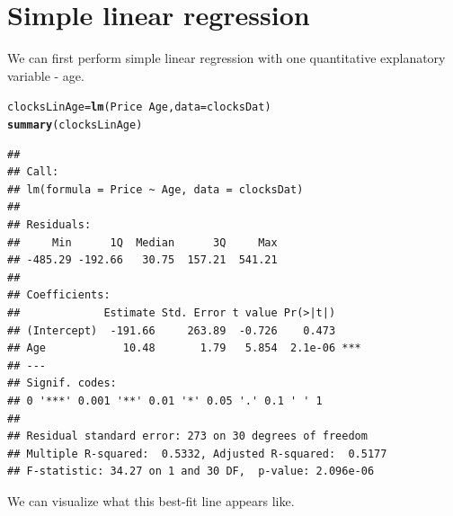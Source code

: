 \documentclass{article}\usepackage[]{graphicx}\usepackage[]{color}
\makeatletter
\newcommand{\hlopt}[1]{\textcolor[rgb]{0,0,0}{#1}}%
\newcommand{\hlstd}[1]{\textcolor[rgb]{0.345,0.345,0.345}{#1}}%
\newcommand{\hlkwb}[1]{\textcolor[rgb]{0.69,0.353,0.396}{#1}}%
\newcommand{\hlkwc}[1]{\textcolor[rgb]{0.333,0.667,0.333}{#1}}%
\newcommand{\hlkwd}[1]{\textcolor[rgb]{0.737,0.353,0.396}{\textbf{#1}}}%
\newenvironment{kframe}{%
 \def\at@end@of@kframe{}%
 \ifinner\ifhmode%
  \def\at@end@of@kframe{\end{minipage}}%
  \begin{minipage}{\columnwidth}%
 \fi\fi%
 \def\FrameCommand##1{\hskip\@totalleftmargin \hskip-\fboxsep
 \colorbox{shadecolor}{##1}\hskip-\fboxsep
     \hskip-\linewidth \hskip-\@totalleftmargin \hskip\columnwidth}%
 \MakeFramed {\advance\hsize-\width
   \@totalleftmargin\z@ \linewidth\hsize
   \@setminipage}}%
 {\par\unskip\endMakeFramed%
 \at@end@of@kframe}
\newenvironment{knitrout}{}{} %
\makeatother
\begin{document}
\section{Simple linear regression}

We can first perform simple linear regression with one quantitative explanatory variable - age.

\begin{knitrout}
\color{fgcolor}\begin{kframe}
\begin{alltt}
\hlstd{clocksLinAge} \hlkwb{=} \hlkwd{lm}\hlstd{(Price} \hlopt{~} \hlstd{Age,} \hlkwc{data}\hlstd{=clocksDat)}
\hlkwd{summary}\hlstd{(clocksLinAge)}
\end{alltt}
\begin{verbatim}
## 
## Call:
## lm(formula = Price ~ Age, data = clocksDat)
## 
## Residuals:
##     Min      1Q  Median      3Q     Max 
## -485.29 -192.66   30.75  157.21  541.21 
## 
## Coefficients:
##             Estimate Std. Error t value Pr(>|t|)    
## (Intercept)  -191.66     263.89  -0.726    0.473    
## Age            10.48       1.79   5.854  2.1e-06 ***
## ---
## Signif. codes:  
## 0 '***' 0.001 '**' 0.01 '*' 0.05 '.' 0.1 ' ' 1
## 
## Residual standard error: 273 on 30 degrees of freedom
## Multiple R-squared:  0.5332,	Adjusted R-squared:  0.5177 
## F-statistic: 34.27 on 1 and 30 DF,  p-value: 2.096e-06
\end{verbatim}
\end{kframe}
\end{knitrout}

\newpage

We can visualize what this best-fit line appears like.
\end{document}
